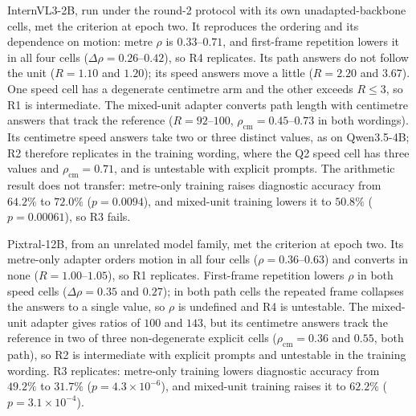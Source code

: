 \documentclass[11pt]{article}
\begin{document}
InternVL3-2B, run under the round-2 protocol with its own unadapted-backbone
cells, met the criterion at epoch two. It reproduces the ordering and its
dependence on motion: metre $\rho$ is $0.33$--$0.71$, and first-frame
repetition lowers it in all four cells ($\Delta\rho=0.26$--$0.42$), so R4
replicates. Its path answers do not follow the unit ($R=1.10$ and $1.20$); its
speed answers move a little ($R=2.20$ and $3.67$). One speed cell has a
degenerate centimetre arm and the other exceeds $R\le3$, so R1 is
intermediate. The mixed-unit adapter converts path length with centimetre
answers that track the reference ($R=92$--$100$, $\rho_{\mathrm{cm}}=0.45$--$0.73$
in both wordings). Its centimetre speed answers take two or three distinct
values, as on Qwen3.5-4B; R2 therefore replicates in the training wording, where
the Q2 speed cell has three values and $\rho_{\mathrm{cm}}=0.71$, and is untestable
with explicit prompts. The arithmetic result does not transfer: metre-only
training raises diagnostic accuracy from $64.2\%$ to $72.0\%$ ($p=0.0094$), and
mixed-unit training lowers it to $50.8\%$ ($p=0.00061$), so R3 fails.

Pixtral-12B, from an unrelated model family, met the criterion at epoch two.
Its metre-only adapter orders motion in all four cells ($\rho=0.36$--$0.63$) and
converts in none ($R=1.00$--$1.05$), so R1 replicates. First-frame repetition
lowers $\rho$ in both speed cells ($\Delta\rho=0.35$ and $0.27$); in both path
cells the repeated frame collapses the answers to a single value, so $\rho$ is
undefined and R4 is untestable. The mixed-unit adapter gives ratios of $100$ and
$143$, but its centimetre answers track the reference in two of three
non-degenerate explicit cells ($\rho_{\mathrm{cm}}=0.36$ and $0.55$, both path),
so R2 is intermediate with explicit prompts and untestable in the training
wording. R3 replicates: metre-only training lowers diagnostic accuracy from
$49.2\%$ to $31.7\%$ ($p=4.3\times10^{-6}$), and mixed-unit training raises it to
$62.2\%$ ($p=3.1\times10^{-4}$).
\end{document}
